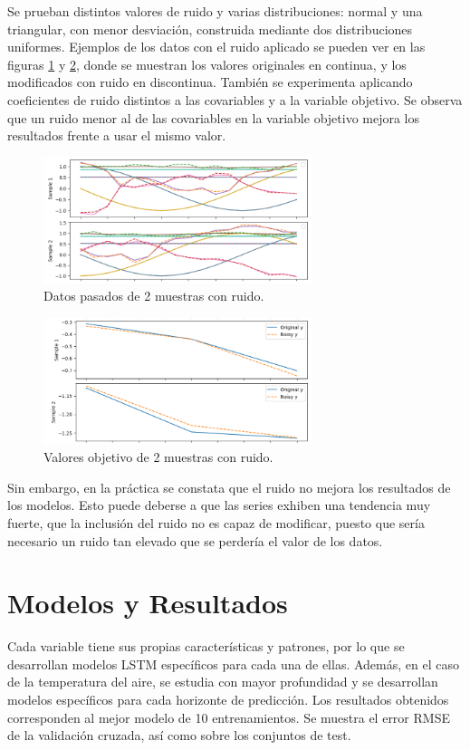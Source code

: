 Se prueban distintos valores de ruido y varias distribuciones: normal y una triangular, con menor desviación, construida mediante dos distribuciones uniformes.
Ejemplos de los datos con el ruido aplicado se pueden ver en las figuras \ref{noise1} y \ref{noise2}, donde se muestran los valores originales en continua, y los 
modificados con ruido en discontinua. También se experimenta aplicando coeficientes de ruido distintos a las covariables 
y a la variable objetivo. Se observa que un ruido menor al de las covariables en la variable objetivo mejora los resultados frente a usar el mismo valor.

\begin{figure}[H]
    \centering
    \includegraphics[width=0.7\textwidth]{images/noise_past_data.png}
    \caption{Datos pasados de 2 muestras con ruido.}
    \label{noise1}
\end{figure}

\begin{figure}[H]
    \centering
    \includegraphics[width=0.7\textwidth]{images/noise_y.png}
    \caption{Valores objetivo de 2 muestras con ruido.}
    \label{noise2}
\end{figure}

Sin embargo, en la práctica se constata que el ruido no mejora los resultados de los modelos. Esto puede deberse a que las series exhiben una tendencia muy fuerte, 
que la inclusión del ruido no es capaz de modificar, puesto que sería necesario un ruido tan elevado que se perdería el valor de los datos.

\section{Modelos y Resultados}
\label{sec:resultados}
Cada variable tiene sus propias características y patrones, por lo que se desarrollan modelos LSTM específicos para cada una de ellas. 
Además, en el caso de la temperatura del aire, se estudia con mayor profundidad y se desarrollan modelos específicos para cada horizonte de predicción.
Los resultados obtenidos corresponden al mejor modelo de 10 entrenamientos. Se muestra el error RMSE de la validación cruzada, así como sobre los conjuntos de test.


